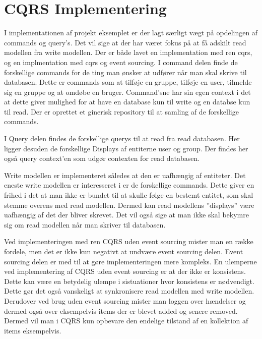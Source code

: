 \chapter{CQRS Implementering}
I implementationen af projekt eksemplet er der lagt særligt vægt på opdelingen af commands og query’s. Det vil sige at der har været fokus på at få adskilt read modellen fra write modellen.
Der er både lavet en implementation med ren cqrs, og en implmentation med cqrs og event sourcing. 
I command delen finde de forskellige commands for de ting man ønsker at udfører når man skal skrive til databasen. Dette er commands som at tilføje en gruppe, tilføje en user, tilmelde sig en gruppe og at omdøbe en bruger. Command’sne har sin egen context i det at dette giver mulighed for at have en database kun til write og en databse kun til read. Der er oprettet et ginerisk repository til at samling af de forskellige commands. 

I Query delen findes de forskellige querys til at read fra read databasen. Her ligger desuden de forskellige Displays af entiterne user og group. Der findes her også query context’en som udgør contexten for read databasen.\newline

Write modellen er implementeret således at den er uafhængig af entiteter. Det eneste write modellen er interesseret i er de forskellige commands. Dette giver en frihed i det at man ikke er bundet til at skulle følge en bestemt entitet, som skal stemme overens med read modellen. Dermed kan read modellens ”displays” være uafhængig af det der bliver skrevet. Det vil også sige at man ikke skal bekymre sig om read modellen når man skriver til databasen.\newline 

Ved implementeringen med ren CQRS uden event sourcing mister man en række fordele, men det er ikke kun negativt at undvære event sourcing delen. Event sourcing delen er med til at gøre implementeringen mere kompleks. En ulemperne ved implementering af CQRS uden event sourcing er at der ikke er konsistens. Dette kan være en betydelig ulempe i sistuationer hvor konsistens er nødvendigt. Dette gør det også vanskeligt at synkronisere read modellen med write modellen. Derudover ved brug uden event sourcing mister man loggen over hændelser og dermed også over eksempelvis items der er blevet added og senere removed. Dermed vil man i CQRS kun opbevare den endelige tilstand af en kollektion af items eksempelvis. 

